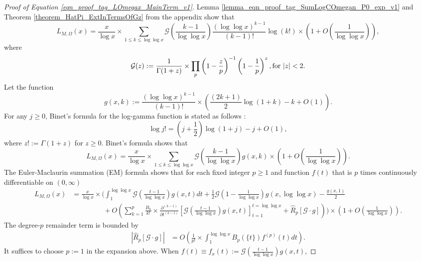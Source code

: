 \documentclass[11pt,reqno,a4letter]{article}
\newcommand{\hlocalref}[1]{\hyperref[#1]{\ref{#1}}}
\numberwithin{equation}{section}
\numberwithin{figure}{section}
\numberwithin{table}{section}
\newcommand{\seqnum}[1]{\href{http://oeis.org/#1}{\color{ProcessBlue}{\underline{#1}}}}
\theoremstyle{plain}
\numberwithin{theorem}{section}
\theoremstyle{definition}
\theoremstyle{remark}
\newcommand{\mathtext}[1]{\text{\rm #1}}
\begin{document}
\begin{proof}[Proof of Equation \eqref{eqn_proof_tag_LOmegax_MainTerm_v1}]
Lemma \hlocalref{lemma_eqn_proof_tag_SumLogCOmegan_P0_exp_v1} and 
Theorem \hlocalref{theorem_HatPi_ExtInTermsOfGz} from the appendix show that 
\[
L_{M,\Omega}(x) = \frac{x}{\log x} \times \sum_{1 \leq k \leq \log\log x} 
	\mathcal{G}\left(\frac{k-1}{\log\log x}\right) \frac{(\log\log x)^{k-1}}{(k-1)!} 
	\log(k!) \times \left(1 + O\left(\frac{1}{\log\log x}\right)\right), 
\]
where 
\[
\mathcal{G}(z) := \frac{1}{\Gamma(1+z)} \times \prod_p \left(1 - \frac{z}{p}\right)^{-1} \left( 
	1 - \frac{1}{p}\right)^z, 
	\mathtext{ for } |z| < 2. 
\]
Let the function 
$$g(x, k) := \frac{(\log\log x)^{k-1}}{(k-1)!} \times \left(\frac{(2k+1)}{2} \log(1+k)-k + O(1)\right).$$ 
For any $j \geq 0$, 
Binet's formula for the log-gamma function is stated as follows 
\cite[\S 5.9(i)]{NISTHB}: 
\[
\log j! = \left(j+\frac{1}{2}\right)\log(1+j) - j + O(1), 
\]
where $z! := \Gamma(1 + z)$ for $z \geq 0$. 
Binet's formula shows that 
\[
L_{M,\Omega}(x) = \frac{x}{\log x} \times \sum_{1 \leq k \leq \log\log x} 
	\mathcal{G}\left(\frac{k-1}{\log\log x}\right) g(x, k) \times 
	\left(1 + O\left(\frac{1}{\log\log x}\right)\right). 
\]
The Euler-Maclaurin summation (EM) formula \cite[\S 9.5]{GKP} shows that 
for each fixed integer $p \geq 1$ and function $f(t)$ that is $p$ times 
continuously differentiable on $(0, \infty)$ 
\cite[\seqnum{A000367}; \seqnum{A002445}]{OEIS} 
\begin{align*}
L_{M,\Omega}(x) & = \frac{x}{\log x} \times \Biggl(
        \int_1^{\log\log x} 
	\mathcal{G}\left(\frac{t-1}{\log\log x}\right) g(x, t) dt + 
	\frac{1}{2}\mathcal{G}\left(1-\frac{1}{\log\log x}\right) 
	g\left(x, \log\log x\right) - \frac{g(x, 1)}{2} \\ 
	& \phantom{=\frac{x}{\log x} \times\ } + 
     O\left(\sum_{k=1}^{p} \frac{B_{k}}{k!} \times \frac{\partial^{(k-1)}}{\partial t^{(k-1)}} 
	\left[\mathcal{G}\left(\frac{t-1}{\log\log x}\right) g(x, t) 
     \right]_{t=1}^{t=\log\log x} + \widehat{R}_{p}[\mathcal{G} \cdot g]\right) 
	\Biggr) \times \left(1 + O\left(\frac{1}{\log\log x}\right)\right). 
\end{align*}
The degree-$p$ remainder term is bounded by 
\begin{align*}
\left\lvert \widehat{R}_p[\mathcal{G} \cdot g] \right\rvert & = 
     O\left(\frac{1}{p!} \times \int_1^{\log\log x} B_p(\{t\}) f^{(p)}(t) dt\right). 
\end{align*}
It suffices to choose $p := 1$ in the expansion above. 
When $f(t) \equiv f_x(t) := \mathcal{G}\left(\frac{t-1}{\log\log x}\right) g(x, t)$, 

\end{proof}
\end{document}
